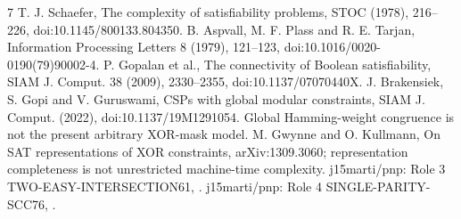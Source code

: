 \documentclass[11pt]{article}
\begin{document}
\begin{thebibliography}{7}
 T. J. Schaefer, The complexity of satisfiability problems, STOC (1978), 216--226, doi:10.1145/800133.804350.
 B. Aspvall, M. F. Plass and R. E. Tarjan, Information Processing Letters 8 (1979), 121--123, doi:10.1016/0020-0190(79)90002-4.
 P. Gopalan et al., The connectivity of Boolean satisfiability, SIAM J. Comput. 38 (2009), 2330--2355, doi:10.1137/07070440X.
 J. Brakensiek, S. Gopi and V. Guruswami, CSPs with global modular constraints, SIAM J. Comput. (2022), doi:10.1137/19M1291054. Global Hamming-weight congruence is not the present arbitrary XOR-mask model.
 M. Gwynne and O. Kullmann, On SAT representations of XOR constraints, arXiv:1309.3060; representation completeness is not unrestricted machine-time complexity.
 j15marti/pnp: Role 3 TWO-EASY-INTERSECTION61, .
 j15marti/pnp: Role 4 SINGLE-PARITY-SCC76, .
\end{thebibliography}
\end{document}
